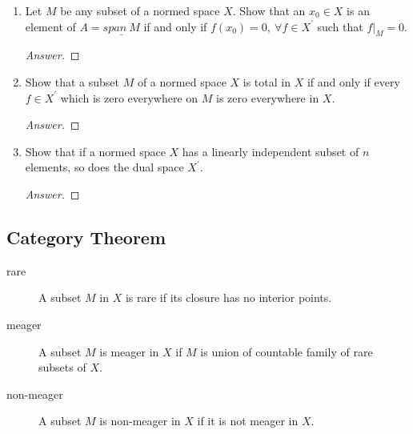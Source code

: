 \begin{enumerate}
	\item Let $M$ be any subset of a normed space $X$.
		Show that an $x_0 \in X$ is an element of $A = \underline{span\ M}$ if and only if $f(x_0) = 0,\ \forall f \in X^\prime$ such that $f|_M = 0$.
		\begin{proof}[Answer]
		\end{proof}
	\item Show that a subset $M$ of a normed space $X$ is total in $X$ if and only if every $f \in X^\prime$ which is zero everywhere on $M$ is zero everywhere in $X$.
		\begin{proof}[Answer]
		\end{proof}
	\item Show that if a normed space $X$ has a linearly independent subset of $n$ elements, so does the dual space $X^\prime$.
		\begin{proof}[Answer]
		\end{proof}
\end{enumerate}
\pagebreak

\subsection{Category Theorem}
\begin{description}
	\item[rare] A subset $M$ in $X$ is rare if its closure has no interior points.
	\item[meager] A subset $M$ is meager in $X$ if $M$ is union of countable family of rare subsets of $X$.
	\item[non-meager] A subset $M$ is non-meager in $X$ if it is not meager in $X$.
\end{description}

